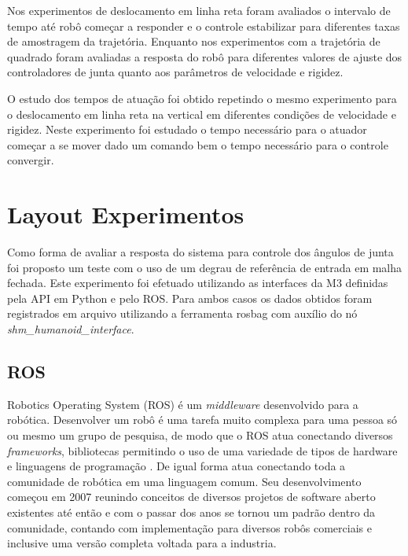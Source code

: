 Nos experimentos de deslocamento em linha reta foram avaliados o intervalo de tempo até robô começar a responder e o controle estabilizar para diferentes taxas de amostragem da trajetória. Enquanto nos experimentos com a trajetória de quadrado foram avaliadas a resposta do robô para diferentes valores de ajuste dos controladores de junta quanto aos parâmetros de velocidade e rigidez.


O estudo dos tempos de atuação foi obtido repetindo o mesmo experimento para o deslocamento em linha reta na vertical em diferentes condições de velocidade e rigidez. Neste experimento foi estudado o tempo necessário para o atuador começar a se mover dado um comando bem o tempo necessário para o controle convergir.



\section{Layout Experimentos}

Como forma de avaliar a resposta do sistema para controle dos ângulos de junta foi proposto um teste com o uso de um degrau de referência de entrada em malha fechada. Este experimento foi efetuado utilizando as interfaces da M3 definidas pela API em Python e pelo ROS. Para ambos casos os dados obtidos foram registrados em arquivo utilizando a ferramenta rosbag com auxílio do nó \textit{shm\_humanoid\_interface}.



\subsection{ROS}

Robotics Operating System (ROS) é um \textit{middleware} desenvolvido para a robótica. Desenvolver um robô é uma tarefa muito complexa para uma pessoa só ou mesmo um grupo de pesquisa, de modo que o ROS atua conectando diversos \textit{frameworks}, bibliotecas permitindo o uso de uma variedade de tipos de hardware e linguagens de programação \cite{quigley2009ros}. De igual forma atua conectando toda a comunidade de robótica em uma linguagem comum. Seu desenvolvimento começou em 2007 reunindo conceitos de diversos projetos de software aberto existentes até então e com o passar dos anos se tornou um padrão dentro da comunidade, contando com implementação para diversos robôs comerciais e inclusive uma versão completa voltada para a industria.

